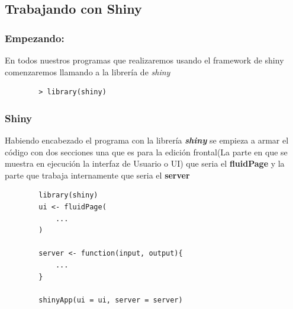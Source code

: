 \documentclass{beamer}
\begin{document}
\subsection{Trabajando con Shiny}
\begin{frame}[fragile]
	\frametitle{Empezando: }
	En todos nuestros programas que realizaremos usando el framework de shiny comenzaremos llamando a la librería de \emph{shiny}
	
	\begin{verbatim}
		> library(shiny)
	\end{verbatim}
	
	
\end{frame}
\begin{frame}[fragile]
	\frametitle{Shiny}
	Habiendo encabezado el programa con la librería \textit{\textbf{shiny}} se empieza a armar el código con dos secciones una que es para la edición frontal(La parte en que se muestra en ejecución la interfaz de Usuario o UI) que seria el \textbf{fluidPage}  y la parte que trabaja internamente que seria el \textbf{server} 
	
	\begin{verbatim}
		library(shiny)
		ui <- fluidPage( 
		    ...
		)
		
		server <- function(input, output){
		    ...	
		}
		
		shinyApp(ui = ui, server = server)
	\end{verbatim}

\end{frame}
\end{document}
